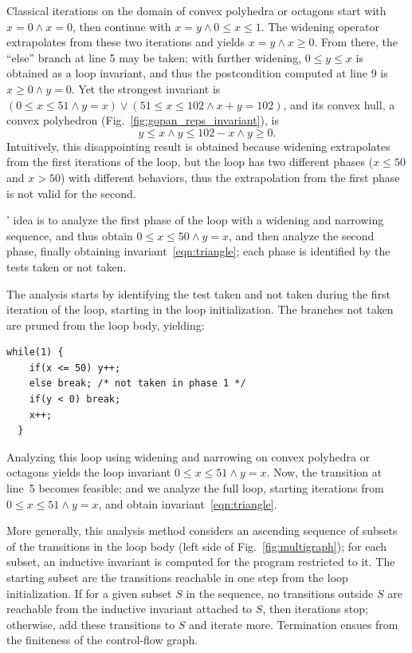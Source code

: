 \documentclass[preprint]{sigplanconf}
\begin{document}
Classical iterations on the domain of convex polyhedra \cite{Halbwachs_PhD,CousotHalbwachs78} or octagons \cite{Mine_PhD,DBLP:journals/lisp/Mine06} start with $x = 0 \land x = 0$, then continue with $x = y \land 0 \leq x \leq 1$.
The widening operator extrapolates from these two iterations and yields $x = y \land x \geq 0$.
From there, the ``else'' branch at line 5 may be taken; with further widening, $0 \leq y \leq x$ is obtained as a loop invariant, and thus the postcondition computed at line 9 is $x \geq 0 \land y = 0$.
Yet the strongest invariant is $(0 \leq x \leq 51 \land y = x) \lor (51 \leq x \leq 102 \land x+y=102)$, and its convex hull, a convex polyhedron (Fig.~\ref{fig:gopan_reps_invariant}), is
\begin{equation}
y \leq x \land y \leq 102-x \land y \geq 0.\label{eqn:triangle}
\end{equation}
Intuitively, this disappointing result is obtained because widening extrapolates from the first iterations of the loop, but the loop has two different phases ($x \leq 50$ and $x > 50$) with different behaviors, thus the extrapolation from the first phase is not valid for the second.

\citeauthor{DBLP:conf/sas/GopanR07}' idea is to analyze the first phase of the loop with a widening and narrowing sequence, and thus obtain $0 \leq x \leq 50 \land y = x$, and then analyze the second phase, finally obtaining invariant~\ref{eqn:triangle}; each phase is identified by the tests taken or not taken.

The analysis starts by identifying the test taken and not taken during the first iteration of the loop, starting in the loop initialization. The branches not taken are pruned from the loop body, yielding:
\begin{lstlisting}[numbers=none]
  while(1) {
    if(x <= 50) y++;
    else break; /* not taken in phase 1 */
    if(y < 0) break;
    x++;
  }
\end{lstlisting}

Analyzing this loop using widening and narrowing on convex polyhedra or octagons yields the loop invariant $0 \leq x \leq 51 \land y = x$. Now, the transition at line~5 becomes feasible; and we analyze the full loop, starting iterations from $0 \leq x \leq 51 \land y = x$, and obtain invariant~\ref{eqn:triangle}.

More generally, this analysis method considers an ascending sequence of subsets of the transitions in the loop body (left side of Fig.~\ref{fig:multigraph});
for each subset, an inductive invariant is computed for the program restricted to it.
The starting subset are the transitions reachable in one step from the loop initialization.
If for a given subset $S$ in the sequence, no transitions outside $S$ are reachable from the inductive invariant attached to $S$, then iterations stop;
otherwise, add these transitions to $S$ and iterate more.
Termination ensues from the finiteness of the control-flow graph.
\end{document}
